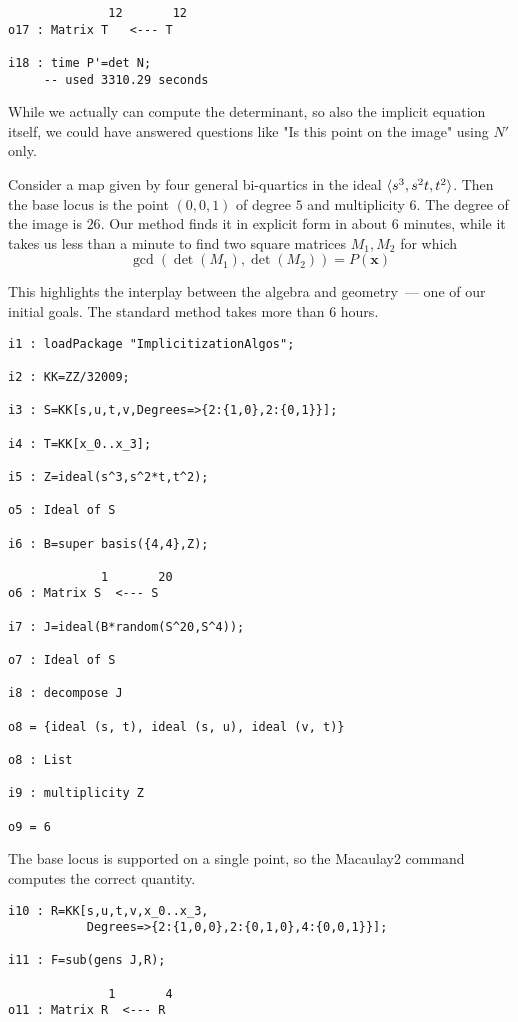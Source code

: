 \documentclass[fleqn,reqno]{amsart}
\begin{document}
\begin{example}[$\mt{ex602}$]
\begin{verbatim}
              12       12
o17 : Matrix T   <--- T

i18 : time P'=det N;
     -- used 3310.29 seconds
\end{verbatim}
While we actually can compute the determinant, so also the implicit equation itself,
we could have answered questions like "Is this point on the image" using $N'$ only.
\end{example}

\begin{example}[$\mt{ex604}$]
\label{ex604}
Consider a map given by four general bi-quartics in the ideal $\langle s^3,s^2t,t^2\rangle$.
Then the base locus is the point $(0,0,1)$ of degree $5$ and multiplicity $6$.
The degree of the image is $26$.
Our method finds it in explicit form in about $6$ minutes,
while it takes us less than a minute to find two square matrices $M_1,M_2$
for which
\[
	\gcd(\det(M_1),\det(M_2))=P(\mathbf x)
\]

This highlights the interplay between the algebra and geometry~--- 
one of our initial goals.
The standard method takes more than 6 hours.
\begin{verbatim}
i1 : loadPackage "ImplicitizationAlgos";

i2 : KK=ZZ/32009;

i3 : S=KK[s,u,t,v,Degrees=>{2:{1,0},2:{0,1}}];

i4 : T=KK[x_0..x_3];

i5 : Z=ideal(s^3,s^2*t,t^2);

o5 : Ideal of S

i6 : B=super basis({4,4},Z);

             1       20
o6 : Matrix S  <--- S

i7 : J=ideal(B*random(S^20,S^4));

o7 : Ideal of S

i8 : decompose J

o8 = {ideal (s, t), ideal (s, u), ideal (v, t)}

o8 : List

i9 : multiplicity Z

o9 = 6
\end{verbatim}
The base locus is supported on a single point, so the Macaulay2 command
computes the correct quantity.
\begin{verbatim}
i10 : R=KK[s,u,t,v,x_0..x_3,
           Degrees=>{2:{1,0,0},2:{0,1,0},4:{0,0,1}}];

i11 : F=sub(gens J,R);

              1       4
o11 : Matrix R  <--- R


\end{verbatim}
\end{example}
\end{document}
